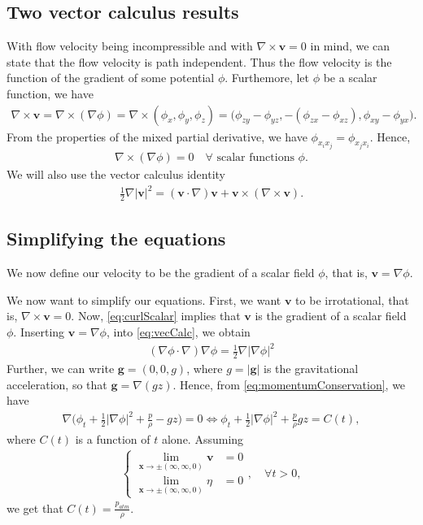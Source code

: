 \documentclass[11pt]{article}
\begin{document}
\subsection{Two vector calculus results}
With flow velocity being incompressible and with $\nabla \times \bm{v} = 0$ in mind, we can state that the flow velocity is path independent. Thus the flow velocity is the function of the gradient of some potential $\phi$.
Furthemore, let $\phi$ be a scalar function, we have
\begin{align*}
    \nabla \times \bm{v} = \nabla \times (\nabla \phi) = \nabla \times (\phi_x, \phi_y, \phi_z) =
        \big(\phi_{zy} - \phi_{yz}, -(\phi_{zx} - \phi_{xz}), \phi_{xy} - \phi_{yx} \big).
\end{align*}
From the properties of the mixed partial derivative, we have $\phi_{x_i x_j} = \phi_{x_j x_i}$. Hence,
\begin{align}
    \label{eq:curlScalar}
    \nabla \times (\nabla \phi) = 0 \quad \forall \text{ scalar functions } \phi.
\end{align}
We will also use the vector calculus identity
\begin{align}
    \label{eq:vecCalc}
    \frac{1}{2}\nabla |\bm{v}|^2 = (\bm{v}\cdot \nabla) \bm{v} + \bm{v} \times (\nabla \times \bm{v}).
\end{align}
%
%
\subsection{Simplifying the equations}
We now define our velocity to be the gradient of a scalar field $\phi$, that is, $\bm{v} = \nabla \phi$.

We now want to simplify our equations. First, we want $\bm{v}$ to be irrotational, that is,
$\nabla \times \bm{v} = 0$. Now, \eqref{eq:curlScalar} implies that $\bm{v}$ is the gradient of a scalar field
$\phi$. Inserting $\bm{v} = \nabla \phi$, into \eqref{eq:vecCalc}, we obtain
\begin{align*}
    (\nabla \phi \cdot \nabla) \nabla \phi = \frac{1}{2}\nabla |\nabla \phi|^2
\end{align*}
Further, we can write $\bm{g} = (0,0,g)$, where $g = |\bm{g}|$ is the gravitational acceleration, so that
$\bm{g} = \nabla (gz)$. Hence, from \eqref{eq:momentumConservation}, we have
\begin{align*}
    \nabla\bigg(\phi_t + \frac{1}{2}|\nabla \phi|^2 + \frac{p}{\rho} - g z \bigg) = 0
    \iff \phi_t + \frac{1}{2}|\nabla \phi|^2 + \frac{p}{\rho}  g z = C(t),
\end{align*}
where $C(t)$ is a function of $t$ alone. Assuming 
\begin{align*}
    \begin{cases}
	    \lim_{\bm{x} \rightarrow \pm(\infty,\infty, 0)}\bm{v} & = 0 \\
	    \lim_{\bm{x} \rightarrow \pm(\infty,\infty, 0)}\eta   & = 0
	\end{cases}, \quad \forall t > 0,
\end{align*}
we get that $C(t) = \frac{p_{atm}}{\rho}$.
\end{document}

